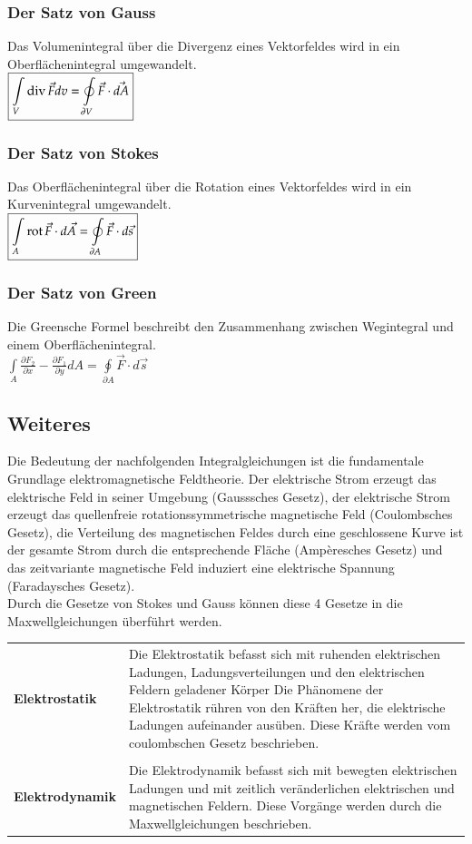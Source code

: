 \subsubsection{Der Satz von Gauss }
Das Volumenintegral über die Divergenz eines Vektorfeldes wird in ein Oberflächenintegral umgewandelt.\\
$\boxed{\int\limits_V \operatorname{div} \vec F dv = \oint\limits_{\partial V} \vec F \cdot \vec{dA}}$
\subsubsection{Der Satz von Stokes }
Das Oberflächenintegral über die Rotation eines Vektorfeldes wird in ein Kurvenintegral umgewandelt. \\
$\boxed{\int\limits_A \operatorname{rot} \vec{F}\cdot d\vec{A}  = \oint\limits_{\partial A}\vec{F}\cdot d\vec{s}}$
\subsubsection{Der Satz von Green }
Die Greensche Formel beschreibt den Zusammenhang zwischen Wegintegral und einem Oberflächenintegral.\\
$\boxed{\int\limits_A \frac{\partial F_2}{\partial x} - \frac{\partial F_1}{\partial y} dA = \oint\limits_{\partial A}\vec{F}\cdot d\vec{s}}$
\subsection{Weiteres}
Die Bedeutung der nachfolgenden Integralgleichungen ist die fundamentale Grundlage elektromagnetische Feldtheorie. Der elektrische Strom erzeugt das elektrische Feld in seiner Umgebung (Gausssches Gesetz), der elektrische Strom erzeugt das quellenfreie rotationssymmetrische magnetische Feld (Coulombsches Gesetz), die Verteilung des magnetischen Feldes durch eine geschlossene Kurve ist der gesamte Strom durch die entsprechende Fläche (Ampèresches Gesetz) und das zeitvariante magnetische Feld induziert eine elektrische Spannung (Faradaysches Gesetz).\\
Durch die Gesetze von Stokes und Gauss können diese 4 Gesetze in die Maxwellgleichungen überführt werden. 
\vspace{-0.8cm}
\begin{longtable}{p{} p{}}
	\textbf{Elektrostatik} & Die Elektrostatik befasst sich mit ruhenden elektrischen Ladungen, Ladungsverteilungen und den elektrischen Feldern geladener Körper
	Die Phänomene der Elektrostatik rühren von den Kräften her, die elektrische Ladungen aufeinander ausüben. Diese Kräfte werden vom coulombschen Gesetz beschrieben.\\
    &\\
	\textbf{Elektrodynamik} & Die Elektrodynamik befasst sich mit bewegten elektrischen Ladungen und mit zeitlich veränderlichen elektrischen und magnetischen Feldern. Diese Vorgänge werden durch die Maxwellgleichungen beschrieben. \\
\end{longtable}
\vspace{-2\baselineskip}

